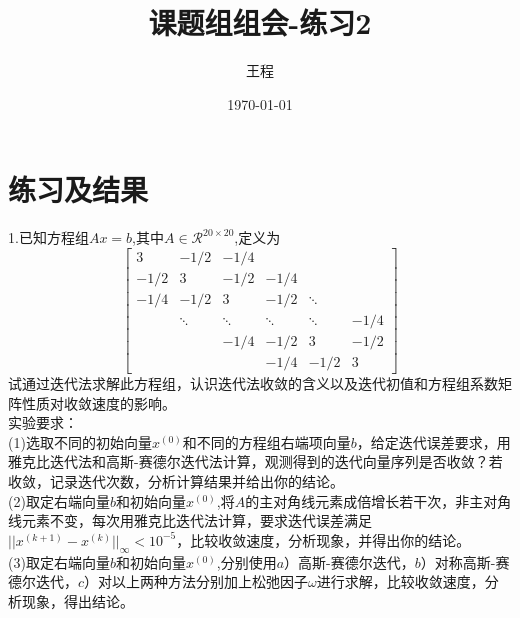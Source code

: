 \documentclass[a4paper,11pt,UTF8]{article}%
\theoremstyle{plain}
\begin{document}
	\title{\heiti 课题组组会-练习2}
	\author{王程 }
	\date{\today}
	\maketitle
	
	\section{练习及结果}
	1.已知方程组$Ax=b$,其中$A\in \mathcal{R}^{20\times20}$,定义为
	\begin{equation*}
		\begin{bmatrix} 
			3 & -1/2 & -1/4 & \\
			-1/2 & 3 & -1/2 & -1/4\\
			-1/4 & -1/2 & 3 & -1/2& \ddots\\
			     & \ddots & \ddots & \ddots &\ddots& -1/4\\
			     &        & -1/4&-1/2 & 3 & -1/2\\
			     &    &   & -1/4 &-1/2 &3
		\end{bmatrix}
	\end{equation*}
试通过迭代法求解此方程组，认识迭代法收敛的含义以及迭代初值和方程组系数矩阵性质对收敛速度的影响。\\
\indent 实验要求：\\
	\indent(1)选取不同的初始向量$x^{\left(0\right)}$和不同的方程组右端项向量$b$，给定迭代误差要求，用雅克比迭代法和高斯-赛德尔迭代法计算，观测得到的迭代向量序列是否收敛？若收敛，记录迭代次数，分析计算结果并给出你的结论。\\
	\indent(2)取定右端向量$b$和初始向量$x^{\left(0\right)}$,将$A$的主对角线元素成倍增长若干次，非主对角线元素不变，每次用雅克比迭代法计算，要求迭代误差满足$||x^{\left(k+1\right)}-x^{\left(k\right)}||_{\infty}<10^{-5}$，比较收敛速度，分析现象，并得出你的结论。\\
	\indent(3)取定右端向量$b$和初始向量$x^{\left(0\right)}$,分别使用$a$）高斯-赛德尔迭代，$b$）对称高斯-赛德尔迭代，$c$）对以上两种方法分别加上松弛因子$\omega$进行求解，比较收敛速度，分析现象，得出结论。 \\
	~\\
\end{document}
